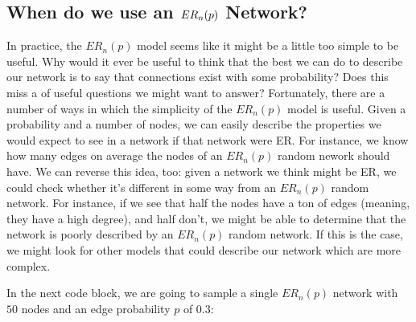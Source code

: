 \documentclass[letterpaper,10pt,english]{jupyterBook}
\begin{document}
\subsection{When do we use an \protect\(ER_n(p)\protect\) Network?}
\label{\detokenize{representations/ch5/single-network-models_ER:when-do-we-use-an-er-n-p-network}}
\sphinxAtStartPar
In practice, the \(ER_n(p)\) model seems like it might be a little too simple to be useful. Why would it ever be useful to think that the best we can do to describe our network is to say that connections exist with some probability? Does this miss a  of useful questions we might want to answer? Fortunately, there are a number of ways in which the simplicity of the \(ER_n(p)\) model is useful. Given a probability and a number of nodes, we can easily describe the properties we would expect to see in a network if that network were ER. For instance, we know how many edges on average the nodes of an \(ER_n(p)\) random nework should have. We can reverse this idea, too: given a network we think might  be ER, we could check whether it’s different in some way from an \(ER_n(p)\) random network. For instance, if we see that half the nodes have a ton of edges (meaning, they have a high degree), and half don’t, we might be able to determine that the network is poorly described by an \(ER_n(p)\) random network. If this is the case, we might look for other models that could describe our network which are more complex.



\sphinxAtStartPar
In the next code block, we are going to sample a single \(ER_n(p)\) network with \(50\) nodes and an edge probability \(p\) of \(0.3\):

\begin{sphinxVerbatim}[commandchars=\\\{\}]
   
   

    
    

     

   
\end{sphinxVerbatim}
\end{document}
